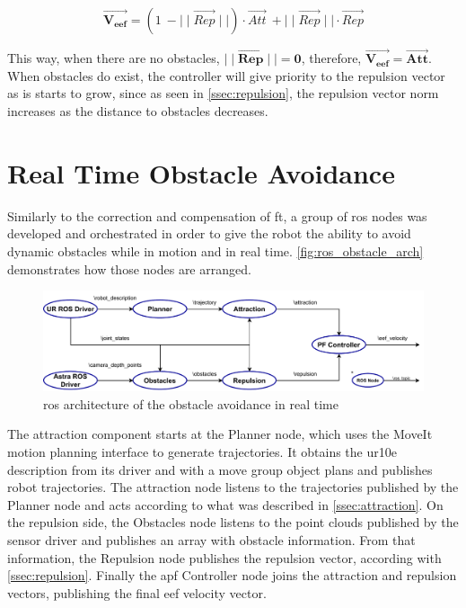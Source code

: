 \begin{equation}
    \vec{\mathbf{V_{eef}}}=(1\:-\mid\mid\vec{Rep}\mid\mid)\cdot\vec{Att}\:+\mid\mid\vec{Rep}\mid\mid\cdot \vec{Rep}
    \label{eq:potential_field}
\end{equation}

\par This way, when there are no obstacles, $\mid\mid\vec{\mathbf{Rep}}\mid\mid\mathbf{=0}$, therefore, $\vec{\mathbf{V_{eef}}}=\vec{\mathbf{Att}}$. When obstacles do exist, the controller will give priority to the repulsion vector as is starts to grow, since as seen in \autoref{ssec:repulsion}, the repulsion vector norm increases as the distance to obstacles decreases.





\section{Real Time Obstacle Avoidance}
\label{sec:obstacle-architecture}


\par Similarly to the correction and compensation of \ac{ft}, a group of \ac{ros} nodes was developed and orchestrated in order to give the robot the ability to avoid dynamic obstacles while in motion and in real time. \autoref{fig:ros_obstacle_arch} demonstrates how those nodes are arranged.

\begin{figure}[h]
    \centering
    \includegraphics[width=\linewidth]{figs/chp4/ros_obstacle_arch.pdf}
    \caption{\ac{ros} architecture of the obstacle avoidance in real time}
    \label{fig:ros_obstacle_arch}
\end{figure}

\par The attraction component starts at the Planner node, which uses the MoveIt motion planning interface to generate trajectories. It obtains the \ac{ur10e} description from its driver and with a move group object plans and publishes robot trajectories. The attraction node listens to the trajectories published by the Planner node and acts according to what was described in \autoref{ssec:attraction}. On the repulsion side, the Obstacles node listens to the point clouds published by the sensor driver and publishes an array with obstacle information. From that information, the Repulsion node publishes the repulsion vector, according with \autoref{ssec:repulsion}. Finally the \ac{apf} Controller node joins the attraction and repulsion vectors, publishing the final \ac{eef} velocity vector.

